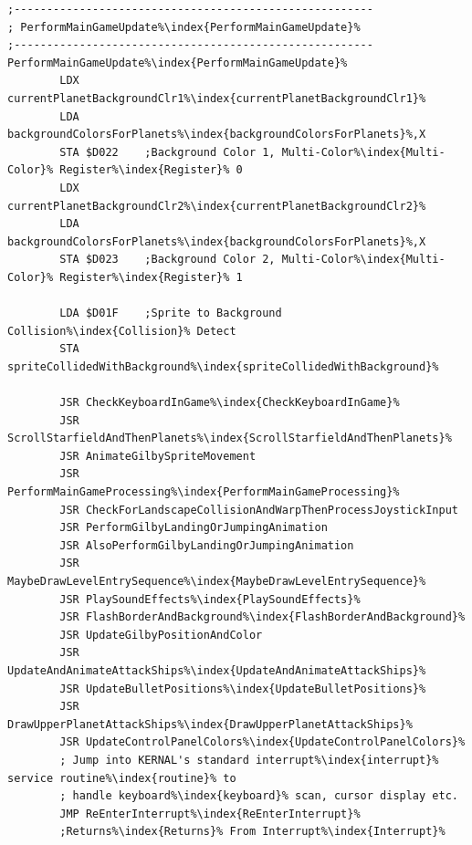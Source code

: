 \begin{lstlisting}[escapechar=\%,caption=\icode{PerformMainGameUpdate\index{PerformMainGameUpdate}}\, the spaghetti junction handling nearly everything
during main gameplay. We'll see more of this code section later in the book\. During the entry level sequence\index{sequence}
it is \icode{MaybeDrawLevelEntrySequence\index{MaybeDrawLevelEntrySequence}} and \icode{PlaySoundEffects\index{PlaySoundEffects}} that do most of the work.]
;-------------------------------------------------------
; PerformMainGameUpdate%\index{PerformMainGameUpdate}%
;-------------------------------------------------------
PerformMainGameUpdate%\index{PerformMainGameUpdate}%
        LDX currentPlanetBackgroundClr1%\index{currentPlanetBackgroundClr1}%
        LDA backgroundColorsForPlanets%\index{backgroundColorsForPlanets}%,X
        STA $D022    ;Background Color 1, Multi-Color%\index{Multi-Color}% Register%\index{Register}% 0
        LDX currentPlanetBackgroundClr2%\index{currentPlanetBackgroundClr2}%
        LDA backgroundColorsForPlanets%\index{backgroundColorsForPlanets}%,X
        STA $D023    ;Background Color 2, Multi-Color%\index{Multi-Color}% Register%\index{Register}% 1

        LDA $D01F    ;Sprite to Background Collision%\index{Collision}% Detect
        STA spriteCollidedWithBackground%\index{spriteCollidedWithBackground}%

        JSR CheckKeyboardInGame%\index{CheckKeyboardInGame}%
        JSR ScrollStarfieldAndThenPlanets%\index{ScrollStarfieldAndThenPlanets}%
        JSR AnimateGilbySpriteMovement
        JSR PerformMainGameProcessing%\index{PerformMainGameProcessing}%
        JSR CheckForLandscapeCollisionAndWarpThenProcessJoystickInput
        JSR PerformGilbyLandingOrJumpingAnimation
        JSR AlsoPerformGilbyLandingOrJumpingAnimation
        JSR MaybeDrawLevelEntrySequence%\index{MaybeDrawLevelEntrySequence}%
        JSR PlaySoundEffects%\index{PlaySoundEffects}%
        JSR FlashBorderAndBackground%\index{FlashBorderAndBackground}%
        JSR UpdateGilbyPositionAndColor
        JSR UpdateAndAnimateAttackShips%\index{UpdateAndAnimateAttackShips}%
        JSR UpdateBulletPositions%\index{UpdateBulletPositions}%
        JSR DrawUpperPlanetAttackShips%\index{DrawUpperPlanetAttackShips}%
        JSR UpdateControlPanelColors%\index{UpdateControlPanelColors}%
        ; Jump into KERNAL's standard interrupt%\index{interrupt}% service routine%\index{routine}% to 
        ; handle keyboard%\index{keyboard}% scan, cursor display etc.
        JMP ReEnterInterrupt%\index{ReEnterInterrupt}% 
        ;Returns%\index{Returns}% From Interrupt%\index{Interrupt}%
\end{lstlisting}


